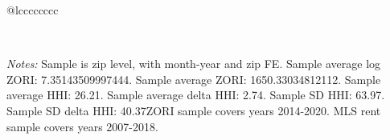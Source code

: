 \begin{table}[H]
{\begin{tabular}{@{\extracolsep{5pt}}lcccccccc}
 \hline  

 \hline \\[-1.8ex]  

  {\parbox[t]{\textwidth}{ \textit{Notes:} Sample is zip level, with month-year and zip FE. Sample average log ZORI: 7.35143509997444. Sample average ZORI: 1650.33034812112. Sample average HHI: 26.21. Sample average delta HHI: 2.74. Sample SD HHI: 63.97. Sample SD delta HHI: 40.37ZORI sample covers years 2014-2020. MLS rent sample covers years 2007-2018.}} \\ 

 \end{tabular}}  

 \end{table}  

 



